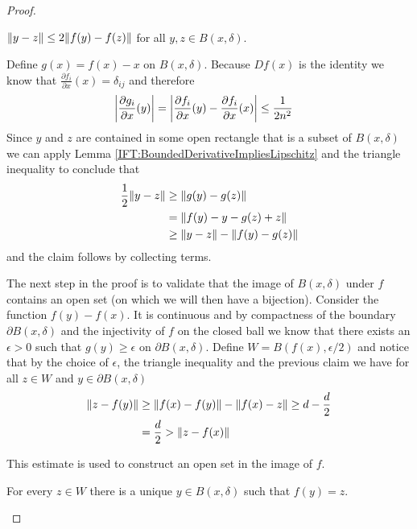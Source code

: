 \begin{proof}
\begin{clm}$\lVert y - z \rVert
\leq 2 \lVert f(y) - f(z) \rVert$ for all $y,z \in B(x, \delta)$.
\end{clm}

Define $g(x) = f(x) - x$ on $B(x, \delta)$.  Because $Df(x)$ is the
identity we know that $\frac{\partial f_i}{\partial x}(x) =
\delta_{ij}$ and therefore 
\begin{align*}
\left \vert \frac{\partial g_i}{\partial x}(y) \right \vert &=
\left \vert \frac{\partial f_i}{\partial x}(y) - \frac{\partial f_i}{\partial
                                           x}(x) \right \vert 
\leq \frac{1}{2n^2}
\end{align*}
Since $y$ and $z$ are contained in some open rectangle that is a
subset of $B(x,\delta)$ we can apply Lemma \ref{IFT:BoundedDerivativeImpliesLipschitz} and the
triangle inequality to
conclude that 
\begin{align*}
\frac{1}{2} \lVert y - z \rVert &\geq \lVert g(y) - g(z) \rVert \\
&=\lVert f(y) - y - g(z) + z \rVert \\
&\geq \lVert y - z \rVert - \lVert f(y) - g(z) \rVert
\end{align*}
and the claim follows by collecting terms.

The next step in the proof is to validate that the image of $B(x,
\delta)$ under $f$ contains an open set (on which we will then have a
bijection).  Consider the function $f(y) - f(x)$.  It is
continuous and by compactness of the boundary $\partial B(x,\delta)$
and the injectivity of $f$ on the closed ball we know that there
exists an $\epsilon > 0$ such that $g(y) \geq \epsilon$ on $\partial
B(x,\delta)$.  Define $W = B(f(x), \epsilon/2)$ and notice that by the
choice of $\epsilon$, the triangle inequality and the previous claim
we have for all $z \in W$ and $y \in \partial B(x, \delta)$
\begin{align}
\lVert z - f(y) \rVert &\geq \lVert f(x) - f(y) \rVert - \lVert f(x) - z \rVert \geq d -
                  \frac{d}{2} \\
&= \frac{d}{2} > \lVert z - f(x) \rVert
\end{align}\label{IFT:InteriorMinimumEstimate}

This estimate is used to construct an open set in the image of $f$.

\begin{clm}For every $z \in W$ there is a unique $y \in B(x, \delta)$ such
that $f(y) = z$.
\end{clm}


\end{proof}
